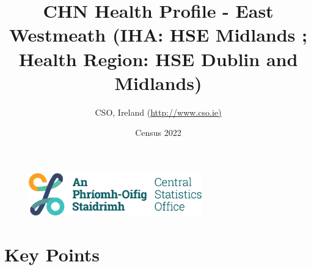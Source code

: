 \documentclass{article}
\title{CHN Health Profile - East Westmeath (IHA: HSE Midlands ;  Health Region: HSE Dublin and Midlands) }
\date{Census 2022}
\author{CSO, Ireland  (\url{http://www.cso.ie)}}
\begin{document}


\begin{figure}
	\centering
\includegraphics[width =75mm]{../figures/CSO_Logo.png}
\end{figure}

				 
		   
						  
														  
																																													
												 
			 
\maketitle
					
													   
				 
						 
																																																																											   
				 
				  
  \pagebreak
    	    \tableofcontents

\pagebreak


\section{Key Points}
\end{document}
